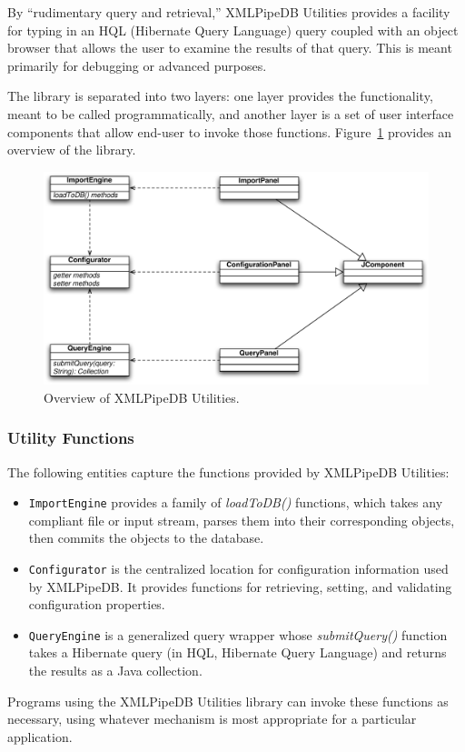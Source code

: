 \documentclass[11pt]{article}
\begin{document}
By ``rudimentary query and retrieval,'' XMLPipeDB Utilities provides a facility for typing in an HQL (Hibernate Query Language) query coupled with an object browser that allows the user to examine the results of that query.  This is meant primarily for debugging or advanced purposes.

The library is separated into two layers: one layer provides the functionality, meant to be called programmatically, and another layer is a set of user interface components that allow end-user to invoke those functions.  Figure~\ref{utils} provides an overview of the library.

\begin{figure}[htbp] %
   \centering
   \includegraphics[width=5in]{figures/xmlpipedb-utilities.pdf} 
   \caption{Overview of XMLPipeDB Utilities.}
   \label{utils}
\end{figure}

\subsubsection{Utility Functions}

The following entities capture the functions provided by XMLPipeDB Utilities:
\begin{itemize}
\item \texttt{ImportEngine} provides a family of \emph{loadToDB()} functions, which takes any compliant file or input stream, parses them into their corresponding objects, then commits the objects to the database.

\item \texttt{Configurator} is the centralized location for configuration information used by XMLPipeDB.  It provides functions for retrieving, setting, and validating configuration properties.

\item \texttt{QueryEngine} is a generalized query wrapper whose \emph{submitQuery()} function takes a Hibernate query (in HQL, Hibernate Query Language) and returns the results as a Java collection.
\end{itemize}
Programs using the XMLPipeDB Utilities library can invoke these functions as necessary, using whatever mechanism is most appropriate for a particular application.
\end{document}
